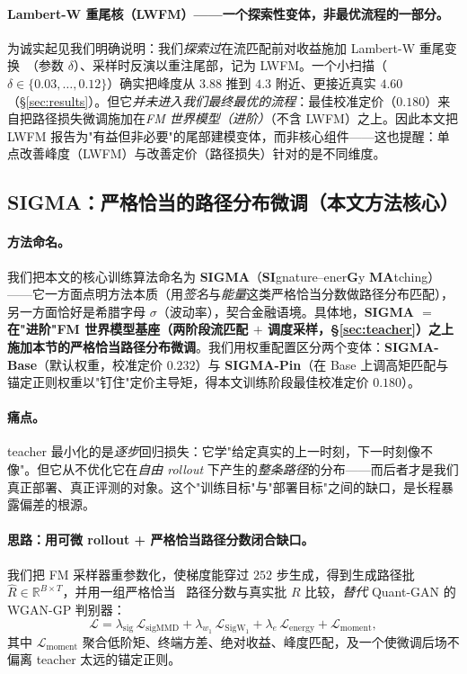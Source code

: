 \documentclass[11pt]{ctexart}
\newcommand{\R}{\mathbb{R}}
\begin{document}
\paragraph{Lambert-W 重尾核（LWFM）——一个探索性变体，非最优流程的一部分。}为诚实起见我们明确说明：我们\emph{探索过}在流匹配前对收益施加 Lambert-W 重尾变换~\citep{goerg2015lambert}（参数 $\delta$）、采样时反演以重注尾部，记为 LWFM。一个小扫描（$\delta\in\{0.03,\dots,0.12\}$）确实把峰度从 $3.88$ 推到 $4.3$ 附近、更接近真实 $4.60$（\S\ref{sec:results}）。但它\emph{并未进入我们最终最优的流程}：最佳校准定价（$0.180$）来自把路径损失微调施加在\emph{FM 世界模型（进阶）}（不含 LWFM）之上。因此本文把 LWFM 报告为"有益但非必要"的尾部建模变体，而非核心组件——这也提醒：单点改善峰度（LWFM）与改善定价（路径损失）针对的是不同维度。

\subsection{SIGMA：严格恰当的路径分布微调（本文方法核心）}
\label{sec:pathloss}
\paragraph{方法命名。}我们把本文的核心训练算法命名为 \textbf{SIGMA}（\textbf{SI}gnature--ener\textbf{G}y \textbf{MA}tching）——它一方面点明方法本质（用\emph{签名}与\emph{能量}这类严格恰当分数做路径分布匹配），另一方面恰好是希腊字母 $\sigma$（波动率），契合金融语境。具体地，\textbf{SIGMA $=$ 在"进阶"FM 世界模型基座（两阶段流匹配 $+$ 调度采样，\S\ref{sec:teacher}）之上施加本节的严格恰当路径分布微调}。我们用权重配置区分两个变体：\textbf{SIGMA-Base}（默认权重，校准定价 $0.232$）与 \textbf{SIGMA-Pin}（在 Base 上调高矩匹配与锚定正则权重以"钉住"定价主导矩，得本文训练阶段最佳校准定价 $\mathbf{0.180}$）。

\paragraph{痛点。}teacher 最小化的是\emph{逐步}回归损失：它学"给定真实的上一时刻，下一时刻像不像"。但它从不优化它在\emph{自由 rollout} 下产生的\emph{整条路径}的分布——而后者才是我们真正部署、真正评测的对象。这个"训练目标"与"部署目标"之间的缺口，是长程暴露偏差的根源。

\paragraph{思路：用可微 rollout + 严格恰当路径分数闭合缺口。}我们把 FM 采样器重参数化，使梯度能穿过 $252$ 步生成，得到生成路径批 $\hat R\in\R^{B\times T}$，并用一组严格恰当~\citep{gneiting2007strictly} 路径分数与真实批 $R$ 比较，\emph{替代} Quant-GAN 的 WGAN-GP 判别器：
\begin{equation}
\mathcal L
= \lambda_{\mathrm{sig}}\,\mathcal L_{\mathrm{sigMMD}}
+ \lambda_{w_1}\,\mathcal L_{\mathrm{SigW_1}}
+ \lambda_{e}\,\mathcal L_{\mathrm{energy}}
+ \mathcal L_{\mathrm{moment}} ,
\end{equation}
其中 $\mathcal L_{\mathrm{moment}}$ 聚合低阶矩、终端方差、绝对收益、峰度匹配，及一个使微调后场不偏离 teacher 太远的锚定正则。
\end{document}

